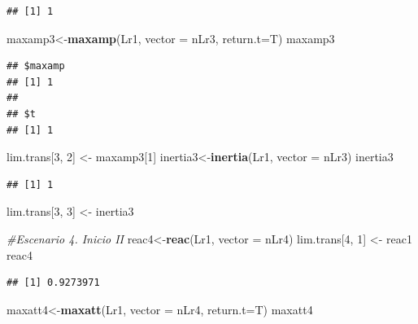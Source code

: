 \documentclass[
]{book}
\newenvironment{Shaded}{\begin{snugshade}}{\end{snugshade}}
\newcommand{\AttributeTok}[1]{\textcolor[rgb]{0.13,0.29,0.53}{#1}}
\newcommand{\CommentTok}[1]{\textcolor[rgb]{0.56,0.35,0.01}{\textit{#1}}}
\newcommand{\DecValTok}[1]{\textcolor[rgb]{0.00,0.00,0.81}{#1}}
\newcommand{\FunctionTok}[1]{\textcolor[rgb]{0.13,0.29,0.53}{\textbf{#1}}}
\newcommand{\NormalTok}[1]{#1}
\newcommand{\OtherTok}[1]{\textcolor[rgb]{0.56,0.35,0.01}{#1}}
\theoremstyle{definition}
\theoremstyle{definition}
\theoremstyle{definition}
\theoremstyle{definition}
\theoremstyle{remark}
\begin{document}
\begin{verbatim}
## [1] 1
\end{verbatim}

\begin{Shaded}
\begin{Highlighting}[]
\NormalTok{maxamp3}\OtherTok{\textless{}{-}}\FunctionTok{maxamp}\NormalTok{(Lr1, }\AttributeTok{vector =}\NormalTok{ nLr3, }\AttributeTok{return.t=}\NormalTok{T)}
\NormalTok{maxamp3}
\end{Highlighting}
\end{Shaded}

\begin{verbatim}
## $maxamp
## [1] 1
## 
## $t
## [1] 1
\end{verbatim}

\begin{Shaded}
\begin{Highlighting}[]
\NormalTok{lim.trans[}\DecValTok{3}\NormalTok{, }\DecValTok{2}\NormalTok{] }\OtherTok{\textless{}{-}}\NormalTok{ maxamp3[}\DecValTok{1}\NormalTok{]}
\NormalTok{inertia3}\OtherTok{\textless{}{-}}\FunctionTok{inertia}\NormalTok{(Lr1, }\AttributeTok{vector =}\NormalTok{ nLr3)}
\NormalTok{inertia3}
\end{Highlighting}
\end{Shaded}

\begin{verbatim}
## [1] 1
\end{verbatim}

\begin{Shaded}
\begin{Highlighting}[]
\NormalTok{lim.trans[}\DecValTok{3}\NormalTok{, }\DecValTok{3}\NormalTok{] }\OtherTok{\textless{}{-}}\NormalTok{ inertia3}

\CommentTok{\#Escenario 4. Inicio II}
\NormalTok{reac4}\OtherTok{\textless{}{-}}\FunctionTok{reac}\NormalTok{(Lr1, }\AttributeTok{vector =}\NormalTok{ nLr4)}
\NormalTok{lim.trans[}\DecValTok{4}\NormalTok{, }\DecValTok{1}\NormalTok{] }\OtherTok{\textless{}{-}}\NormalTok{ reac1}
\NormalTok{reac4}
\end{Highlighting}
\end{Shaded}

\begin{verbatim}
## [1] 0.9273971
\end{verbatim}

\begin{Shaded}
\begin{Highlighting}[]
\NormalTok{maxatt4}\OtherTok{\textless{}{-}}\FunctionTok{maxatt}\NormalTok{(Lr1, }\AttributeTok{vector =}\NormalTok{ nLr4, }\AttributeTok{return.t=}\NormalTok{T)}
\NormalTok{maxatt4}
\end{Highlighting}
\end{Shaded}
\end{document}
